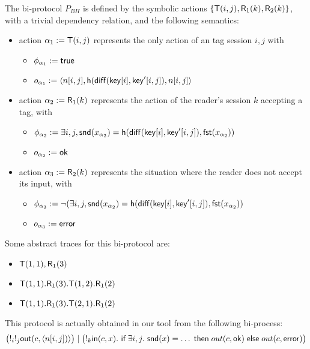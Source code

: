 \begin{example}
  \label{ex:basic-hash-bi-process}
  The bi-protocol $P_{BH}$ is defined by the symbolic actions
  $\{\textsf{T}(i,j),\textsf{R}_1(k),\textsf{R}_2(k)\}$, with a trivial dependency relation,
  and the following semantics:
    \begin{itemize}
      \item action $\alpha_1 := \textsf{T}(i,j)$ represents the only
        action of an tag session $i,j$ with
        \begin{itemize}
          \item $\phi_{\alpha_1} := \textsf{true}$
          \item $o_{\alpha_1} := \langle n[i,j], \mathsf{h}(\mathsf{diff}(\mathsf{key}[i],\mathsf{key}'[i,j]),n[i,j] \rangle$
        \end{itemize}
      \item action $\alpha_2 := \textsf{R}_1(k)$ represents the action
        of the reader's session $k$ accepting a tag, with
        \begin{itemize}
          \item $\phi_{\alpha_2} := \exists i,j, \mathsf{snd}(x_{\alpha_2}) =
            \mathsf{h}(\mathsf{diff}(\mathsf{key}[i],\mathsf{key}'[i,j]),\mathsf{fst}(x_{\alpha_2}))$
          \item $o_{\alpha_2} := \mathsf{ok}$
        \end{itemize}
      \item action $\alpha_3 := \textsf{R}_2(k)$ represents the situation
        where the reader does not accept its input, with
        \begin{itemize}
          \item $\phi_{\alpha_3} := \neg (\exists i,j, \mathsf{snd}(x_{\alpha_2}) =  \mathsf{h}(\mathsf{diff}(\mathsf{key}[i],\mathsf{key}'[i,j]),\mathsf{fst}(x_{\alpha_2}))$
          \item $o_{\alpha_3} := \mathsf{error}$
        \end{itemize}
    \end{itemize}
  Some abstract traces for this bi-protocol are:
  \begin{itemize}
    \item $\textsf{T}(1,1),\textsf{R}_1(3)$
    \item $\textsf{T}(1,1).\textsf{R}_1(3).\textsf{T}(1,2).\textsf{R}_1(2)$
    \item $\textsf{T}(1,1).\textsf{R}_1(3).\textsf{T}(2,1).\textsf{R}_1(2)$
  \end{itemize}
  This protocol is actually obtained in our tool from the following
  bi-process:
  $$\bigl(!_i !_j \mathsf{out}(c,\langle  n[i,j]) \rangle\bigr) \mid
   \bigl(!_k \mathsf{in}(c,x).~ \textsf{if}\; \exists i,j.~ \mathsf{snd}(x) = \ldots \;\textsf{then}\;
    out(c,\mathsf{ok}) \;\textsf{else}\; out(c,\mathsf{error})\bigr)$$
\end{example}

